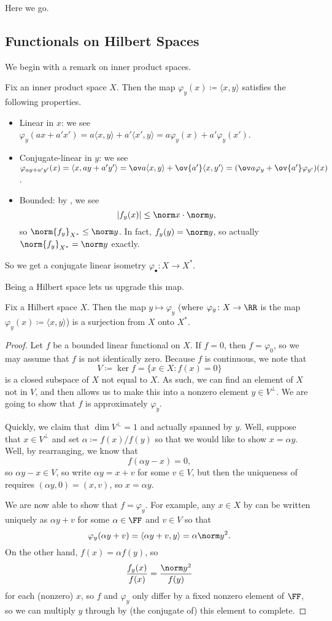 \documentclass[../notes.tex]{subfiles}
\begin{document}
Here we go.

\subsection{Functionals on Hilbert Spaces}
We begin with a remark on inner product spaces.
\begin{remark}
	Fix an inner product space $X$. Then the map $\varphi_y(x)\coloneqq\langle x,y\rangle$ satisfies the following properties.
	\begin{itemize}
		\item Linear in $x$: we see $\varphi_y(ax+a'x')=a\langle x,y\rangle+a'\langle x',y\rangle=a\varphi_y(x)+a'\varphi_y(x')$.
		\item Conjugate-linear in $y$: we see $\varphi_{ay+a'y'}(x)=\langle x,ay+a'y'\rangle=\ov a\langle x,y\rangle+\ov{a'}\langle x,y'\rangle=(\ov a\varphi_y+\ov{a'}\varphi_{y'})(x)$.
		\item Bounded: by , we see
		\[\left|f_y(x)\right|\le\norm x\cdot\norm y,\]
		so $\norm{f_y}_{X^*}\le\norm y$. In fact, $f_y(y)=\norm y$, so actually $\norm{f_y}_{X^*}=\norm y$ exactly.
	\end{itemize}
	So we get a conjugate linear isometry $\varphi_\bullet\colon X\to X^*$.
\end{remark}
Being a Hilbert space lets us upgrade this map.
\begin{proposition} \label{prop:hilb-star}
	Fix a Hilbert space $X$. Then the map $y\mapsto\varphi_y$ (where $\varphi_y\colon X\to\RR$ is the map $\varphi_y(x)\coloneqq\langle x,y\rangle$) is a surjection from $X$ onto $X^*$.
\end{proposition}
\begin{proof}
	Let $f$ be a bounded linear functional on $X$. If $f=0$, then $f=\varphi_0$, so we may assume that $f$ is not identically zero. Because $f$ is continuous, we note that
	\[V\coloneqq\ker f=\{x\in X:f(x)=0\}\]
	is a closed subspace of $X$ not equal to $X$. As such, we can find an element of $X$ not in $V$, and then  allows us to make this into a nonzero element $y\in V^\perp$. We are going to show that $f$ is approximately $\varphi_y$.

	Quickly, we claim that $\dim V^\perp=1$ and actually spanned by $y$. Well, suppose that $x\in V^\perp$ and set $\alpha\coloneqq f(x)/f(y)$ so that we would like to show $x=\alpha y$. Well, by rearranging, we know that
	\[f(\alpha y-x)=0,\]
	so $\alpha y-x\in V$, so write $\alpha y=x+v$ for some $v\in V$, but then the uniqueness of  requires $(\alpha y,0)=(x,v)$, so $x=\alpha y$.

	We are now able to show that $f=\varphi_y$. For example, any $x\in X$ by  can be written uniquely as $\alpha y+v$ for some $\alpha\in\FF$ and $v\in V$ so that
	\[\varphi_y(\alpha y+v)=\langle\alpha y+v,y\rangle=\alpha\norm y^2.\]
	On the other hand, $f(x)=\alpha f(y)$, so
	\[\frac{f_y(x)}{f(x)}=\frac{\norm y^2}{f(y)}\]
	for each (nonzero) $x$, so $f$ and $\varphi_y$ only differ by a fixed nonzero element of $\FF$, so we can multiply $y$ through by (the conjugate of) this element to complete.
\end{proof}
\end{document}
